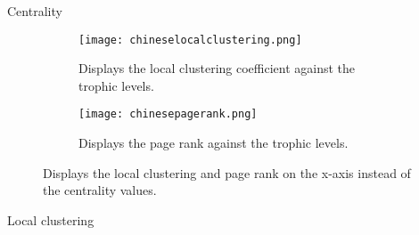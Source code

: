 Centrality

\begin{figure}[H]
\centering
\begin{subfigure}{.45\textwidth}
	\hspace{-1cm} 
	\texttt{[image: chineselocalclustering.png]}
	\caption{Displays the local clustering coefficient against the trophic levels.}
	\label{fig:cnlc}
\end{subfigure}
\hfill
\begin{subfigure}{.45\textwidth}
	\hspace{-1cm} 
	\texttt{[image: chinesepagerank.png]}
	\caption{Displays the page rank against the trophic levels.}
	\label{fig:cnpr}
\end{subfigure}
\caption{Displays the local clustering and page rank on the x-axis instead of the centrality values.}
\label{fig:jpother}
\end{figure}

Local clustering

